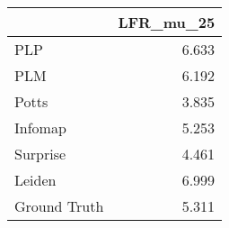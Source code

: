 \begin{tabular}{lr}
\toprule
{} & LFR_mu_25 \\
\midrule
PLP          &     6.633 \\
PLM          &     6.192 \\
Potts        &     3.835 \\
Infomap      &     5.253 \\
Surprise     &     4.461 \\
Leiden       &     6.999 \\
Ground Truth &     5.311 \\
\bottomrule
\end{tabular}
